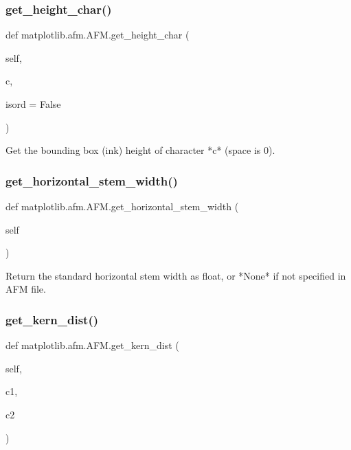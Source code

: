 \subsubsection{\texorpdfstring{get\+\_\+height\+\_\+char()}{get\_height\_char()}}
{\footnotesize\ttfamily def matplotlib.\+afm.\+A\+F\+M.\+get\+\_\+height\+\_\+char (\begin{DoxyParamCaption}\item[{}]{self,  }\item[{}]{c,  }\item[{}]{isord = {\ttfamily False} }\end{DoxyParamCaption})}

\begin{DoxyVerb}Get the bounding box (ink) height of character *c* (space is 0).\end{DoxyVerb}
 \mbox{\label{classmatplotlib_1_1afm_1_1AFM_aa1235f6a072bd824a574fd1bc12a73a6}} 
\subsubsection{\texorpdfstring{get\+\_\+horizontal\+\_\+stem\+\_\+width()}{get\_horizontal\_stem\_width()}}
{\footnotesize\ttfamily def matplotlib.\+afm.\+A\+F\+M.\+get\+\_\+horizontal\+\_\+stem\+\_\+width (\begin{DoxyParamCaption}\item[{}]{self }\end{DoxyParamCaption})}

\begin{DoxyVerb}Return the standard horizontal stem width as float, or *None* if
not specified in AFM file.
\end{DoxyVerb}
 \mbox{\label{classmatplotlib_1_1afm_1_1AFM_adbc3431c3bce53ff2f8b706fbd1de6d2}} 
\subsubsection{\texorpdfstring{get\+\_\+kern\+\_\+dist()}{get\_kern\_dist()}}
{\footnotesize\ttfamily def matplotlib.\+afm.\+A\+F\+M.\+get\+\_\+kern\+\_\+dist (\begin{DoxyParamCaption}\item[{}]{self,  }\item[{}]{c1,  }\item[{}]{c2 }\end{DoxyParamCaption})}

